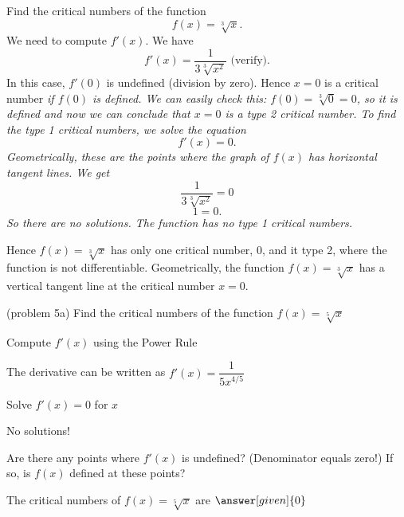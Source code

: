 \documentclass{ximera}
\begin{document}
\begin{example}[example 5] Find the critical numbers of the function 
\[f(x) = \sqrt[3] x.\]
We need to compute $f'(x)$.  We have
\[f'(x) = \frac{1}{3\sqrt[3]{x^2}} \text{   (verify)}.\]
In this case, $f'(0)$ is undefined (division by zero). Hence $x=0$ is a critical number \it{if}
$f(0)$ is defined.  We can easily check this: $f(0) = \sqrt[3] 0 = 0$, so it is defined and now we can conclude 
that $x=0$ is a type 2 critical number.
To find the type 1 critical numbers, we solve the equation
\[f'(x) = 0.\]
Geometrically, these are the points where the graph of $f(x)$ has horizontal tangent lines.
We get
\[ \frac{1}{3\sqrt[3]{x^2}} =0\]
\[ 1 =0.\]
So there are no solutions.  The function has no type 1 critical numbers.


Hence $f(x) = \sqrt[3] x$ has only one critical number, 0, and it type 2, 
where the function is not differentiable. 
Geometrically, the function $f(x) = \sqrt[3] x$ has a vertical tangent line at the critical number $x = 0$.


\begin{image}
\end{image}

\end{example}

\begin{problem}(problem 5a)
  Find the critical numbers of the function $f(x) = \sqrt[5] x$
  
  \begin{explanation}
    \begin{hint}
      Compute $f'(x)$ using the Power Rule
    \end{hint}
    \begin{hint}
      The derivative can be written as $f'(x) = \dfrac{1}{5x^{4/5}}$
    \end{hint}
		\begin{hint}
      Solve $f'(x) = 0$ for $x$
    \end{hint}
		\begin{hint}
      No solutions!
    \end{hint}
    \begin{hint}
      Are there any points where $f'(x)$ is undefined? (Denominator equals zero!)
      If so, is $f(x)$ defined at these points?  
		\end{hint}
    
    
		The critical numbers of $f(x) = \sqrt[5] x$ are
		 $\answer[given]{0}$
		\end{explanation}
\end{problem}
\end{document}
